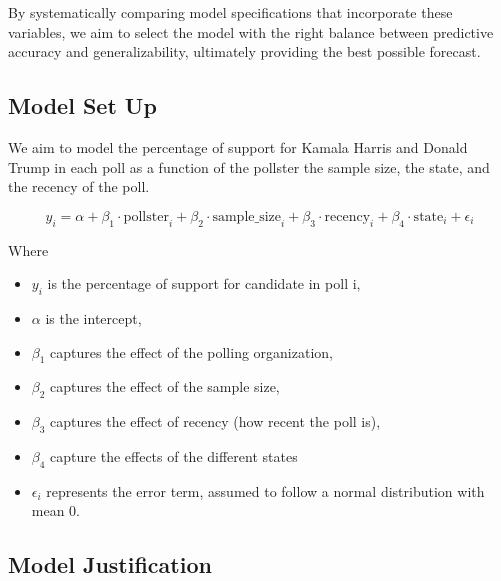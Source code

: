 \documentclass[
  letterpaper,
  DIV=11,
  numbers=noendperiod]{scrartcl}
\begin{document}
By systematically comparing model specifications that incorporate these
variables, we aim to select the model with the right balance between
predictive accuracy and generalizability, ultimately providing the best
possible forecast.

\hypertarget{model-set-up}{%
\subsection{Model Set Up}\label{model-set-up}}

We aim to model the percentage of support for Kamala Harris and Donald
Trump in each poll as a function of the pollster the sample size, the
state, and the recency of the poll.

\[
y_i = \alpha + \beta_1 \cdot \mathrm{pollster}_i + \beta_2 \cdot \mathrm{sample\_size}_i + \beta_3 \cdot \mathrm{recency}_i +  \beta_4 \cdot \mathrm{state}_i + \epsilon_i
\]

Where

\begin{itemize}
\item
  \(y_i\) is the percentage of support for candidate in poll i,
\item
  \(α\) is the intercept,
\item
  \(β_1\) captures the effect of the polling organization,
\item
  \(β_2\) captures the effect of the sample size,
\item
  \(β_3\) captures the effect of recency (how recent the poll is),
\item
  \(β_4\) capture the effects of the different states
\item
  \(\epsilon_i\) represents the error term, assumed to follow a normal
  distribution with mean 0.
\end{itemize}

\hypertarget{model-justification}{%
\subsection{Model Justification}\label{model-justification}}
\end{document}
